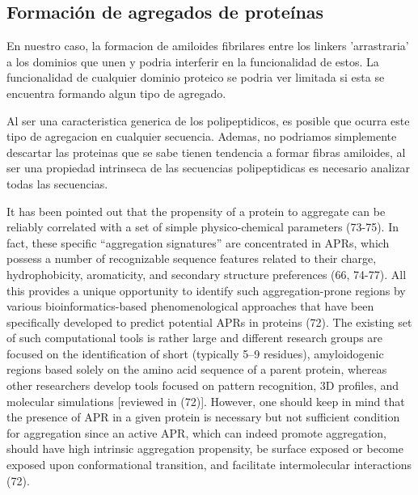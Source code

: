 \subsection{Formación de agregados de proteínas}



En nuestro caso, la formacion de amiloides fibrilares entre los linkers 'arrastraria' a los dominios que unen y podria interferir en la funcionalidad de estos. 
La funcionalidad de cualquier dominio proteico se podria ver limitada si esta se encuentra formando algun tipo de agregado.

Al ser una caracteristica generica de los polipeptidicos, es posible que ocurra este tipo de agregacion en cualquier secuencia. 
Ademas, no podriamos simplemente descartar las proteinas que se sabe tienen tendencia a formar fibras amiloides, al ser una propiedad intrinseca de las secuencias polipeptidicas es necesario analizar todas las secuencias.







% 
It has been pointed out that the propensity of a protein to aggregate can be reliably correlated with a set of simple
physico-chemical parameters (73-75). In fact, these specific “aggregation signatures” are concentrated in APRs, which possess a
number of recognizable sequence features related to their charge, hydrophobicity, aromaticity, and secondary structure
preferences (66, 74-77). All this provides a unique opportunity to identify such aggregation-prone regions by various
bioinformatics-based phenomenological approaches that have been specifically developed to predict potential APRs in proteins
(72). The existing set of such computational tools is rather large and different research groups are focused on the identification of
short (typically 5–9 residues), amyloidogenic regions based solely on the amino acid sequence of a parent protein, whereas other
researchers develop tools focused on pattern recognition, 3D profiles, and molecular simulations [reviewed in (72)]. However,
one should keep in mind that the presence of APR in a given protein is necessary but not sufficient condition for aggregation
since an active APR, which can indeed promote aggregation, should have high intrinsic aggregation propensity, be surface
exposed or become exposed upon conformational transition, and facilitate intermolecular interactions (72).


